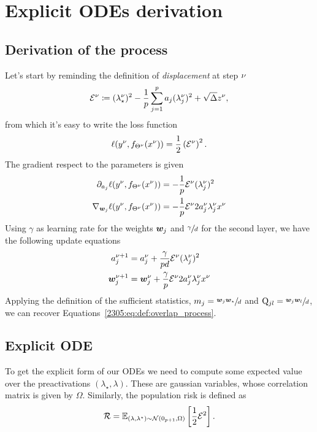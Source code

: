 \section{Explicit ODEs derivation}

\label{2305:app:square_equations}
\subsection{Derivation of the process}
Let's start by reminding the definition of \emph{displacement} at step \(\nu\)
\begin{equation}
\mathcal{E}^{\nu} \coloneqq (\lambda_{\star}^\nu)^2 - \frac{1}{p}\sum_{j=1}^{p}a_{j}(\lambda_{j}^{\nu})^2 + \sqrt{\Delta} z^{\nu},
\end{equation}
from which it's easy to write the loss function
\begin{equation}
    \ell{(y^{\nu},f_{\Theta^{\nu}}(x^{\nu}))} = \frac12 \left(\mathcal{E}^{\nu}\right)^2.
\end{equation}
The gradient respect to the parameters is given
\begin{equation}\begin{split}
    \partial_{a_j} \ell{(y^{\nu},f_{\Theta^{\nu}}(x^{\nu}))} &= -\frac1p \mathcal{E}^{\nu} (\lambda_{j}^{\nu})^2 \\
    \nabla_{{\boldsymbol{w}}_j} \ell{(y^{\nu},f_{\Theta^{\nu}}(x^{\nu}))}  &= -\frac1p \mathcal{E}^{\nu} 2 a^\nu_j \lambda_{j}^{\nu} x^\nu
\end{split}\end{equation}
Using \(\gamma\) as learning rate for the weights \({\boldsymbol{w}}_j\) and \(\sfrac{\gamma}{d}\) for the second layer, we have the following update equations
\begin{equation}\begin{split}
    a^{\nu+1}_j &= a^{\nu}_j + \frac{\gamma}{pd} \mathcal{E}^{\nu} (\lambda_{j}^{\nu})^2 \\
    {\boldsymbol{w}}_j^{\nu+1} &= {\boldsymbol{w}}_j^{\nu} + \frac{\gamma}{p} \mathcal{E}^{\nu} 2 a^\nu_j \lambda_{j}^{\nu} x^\nu
\end{split}\end{equation}
Applying the definition of the sufficient statistics, \(m_j = \sfrac{{\boldsymbol{w}}_j{\boldsymbol{w}}_\star}{d}\) and \(\mathrm{Q}_{jl} = \sfrac{{\boldsymbol{w}}_j{\boldsymbol{w}}_l}{d}\), we can recover Equations~\eqref{2305:eq:def:overlap_process}.

\subsection{Explicit ODE}
To get the explicit form of our ODEs we need to compute some expected value over the preactivations \((\lambda_\star,\lambda)\).
These are gaussian variables, whose correlation matrix is given by \(\Omega\).
Similarly, the population risk is defined as
\[
    \mathcal{R} = \mathbb E_{(\lambda,\lambda^{\star})\sim\mathcal{N}(0_{p+1}, \Omega)}\left[\frac12 \mathcal{E}^2\right].
\]

